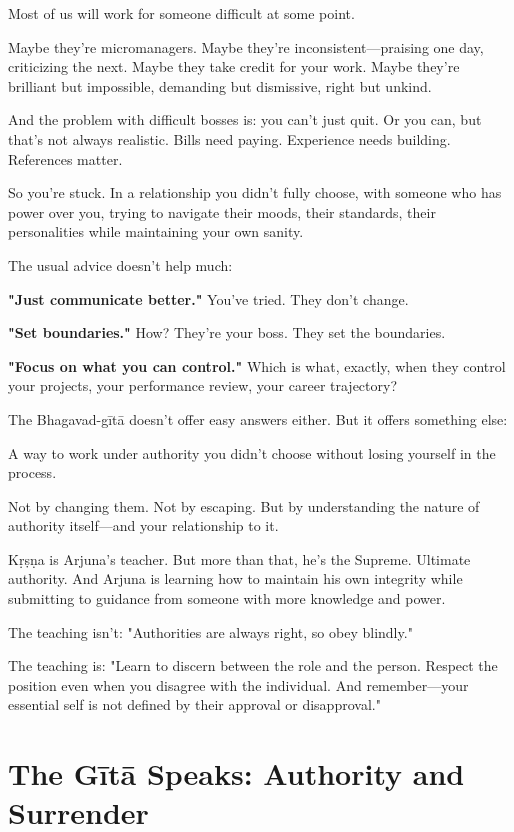 \documentclass[11pt,twoside]{book}
\begin{document}
Most of us will work for someone difficult at some point.

Maybe they're micromanagers. Maybe they're inconsistent—praising one day, criticizing the next. Maybe they take credit for your work. Maybe they're brilliant but impossible, demanding but dismissive, right but unkind.

And the problem with difficult bosses is: you can't just quit. Or you can, but that's not always realistic. Bills need paying. Experience needs building. References matter.

So you're stuck. In a relationship you didn't fully choose, with someone who has power over you, trying to navigate their moods, their standards, their personalities while maintaining your own sanity.

The usual advice doesn't help much:

\textbf{\textbf{"Just communicate better."}} You've tried. They don't change.

\textbf{\textbf{"Set boundaries."}} How? They're your boss. They set the boundaries.

\textbf{\textbf{"Focus on what you can control."}} Which is what, exactly, when they control your projects, your performance review, your career trajectory?

The Bhagavad-gītā doesn't offer easy answers either. But it offers something else:

A way to work under authority you didn't choose without losing yourself in the process.

Not by changing them. Not by escaping. But by understanding the nature of authority itself—and your relationship to it.

Kṛṣṇa is Arjuna's teacher. But more than that, he's the Supreme. Ultimate authority. And Arjuna is learning how to maintain his own integrity while submitting to guidance from someone with more knowledge and power.

The teaching isn't: "Authorities are always right, so obey blindly."

The teaching is: "Learn to discern between the role and the person. Respect the position even when you disagree with the individual. And remember—your essential self is not defined by their approval or disapproval."

\section*{The Gītā Speaks: Authority and Surrender}
\end{document}
